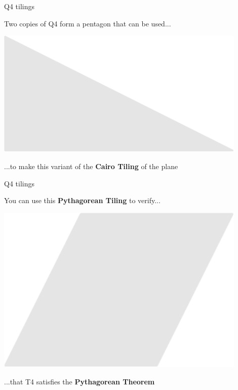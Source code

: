 \documentclass[14pt]{beamer}
\begin{document}
    \begin{frame}{Q4 tilings}
        \begin{center}
            Two copies of Q4 form a pentagon that can be used...

            \bigskip \bigskip

            \includegraphics[width=0.9\textwidth]{figures/figure023c.pdf}

            \bigskip \bigskip

            ...to make this variant of the \textbf{Cairo Tiling} of the plane
        \end{center}
    \end{frame}


    \begin{frame}{Q4 tilings}
        \begin{center}
            You can use this \textbf{Pythagorean Tiling} to verify...

            \bigskip \bigskip

            \includegraphics[width=0.9\textwidth]{figures/figure023f.pdf}

            \bigskip \bigskip

            ...that T4 satisfies the \textbf{Pythagorean Theorem}
        \end{center}
    \end{frame}
\end{document}
